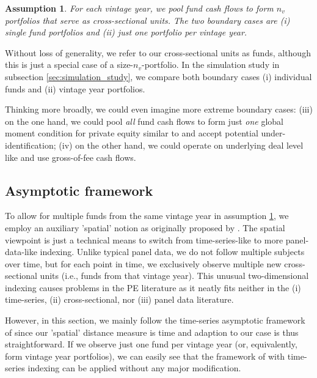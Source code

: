 \documentclass[12pt]{article}
\newtheorem{assume}{Assumption}
\begin{document}
\begin{assume}
	\label{as:portfolio}
	For each vintage year, we pool fund cash flows to form $n_v$ portfolios that serve as cross-sectional units.
	The two boundary cases are (i) single fund portfolios and (ii) just one portfolio per vintage year. 
\end{assume}
Without loss of generality, we refer to our cross-sectional units as funds, although this is just a special case of a size-$n_v$-portfolio.
In the simulation study in subsection \ref{sec:simulation_study}, we compare both boundary cases (i) individual funds and (ii) vintage year portfolios.

Thinking more broadly, we could even imagine more extreme boundary cases: 
(iii) on the one hand, we could pool \emph{all} fund cash flows to form just \emph{one} global moment condition for private equity similar to \cite{KN16} and accept potential under-identification; 
(iv) on the other hand, we could operate on underlying deal level like \cite{B14,B16} and use gross-of-fee cash flows.

\subsection{Asymptotic framework}
\label{sec:asymptotic_framework}

To allow for multiple funds from the same vintage year in assumption \ref{as:portfolio}, we employ an auxiliary 'spatial' notion as originally proposed by \cite{KN16}.
The spatial viewpoint is just a technical means to switch from time-series-like to more panel-data-like indexing.
Unlike typical panel data, we do not follow multiple subjects over time, but for each point in time, we exclusively observe multiple new cross-sectional units (i.e., funds from that vintage year).
This unusual two-dimensional indexing causes problems in the PE literature as it neatly fits neither in the (i) time-series, (ii) cross-sectional, nor (iii) panel data literature.

However, in this section, we mainly follow the time-series asymptotic framework of \cite{PP97} since our 'spatial' distance measure is time and adaption to our case is thus straightforward.
If we observe just one fund per vintage year (or, equivalently, form vintage year portfolios), we can easily see that the framework of \cite{PP97} with time-series indexing can be applied without any major modification.
\end{document}
